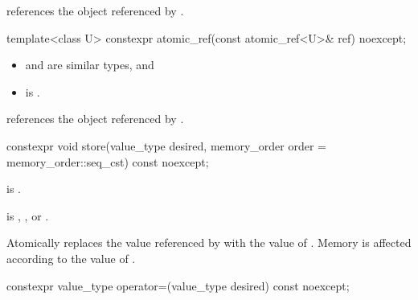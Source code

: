 \begin{itemdescr}
\pnum
\ensures
{} references the object referenced by .
\end{itemdescr}

\begin{itemdecl}
template<class U>
  constexpr atomic_ref(const atomic_ref<U>& ref) noexcept;
\end{itemdecl}

\begin{itemdescr}
\pnum
\constraints
\begin{itemize}
\item {} and  are similar types, and
\item {} is .
\end{itemize}

\pnum
\ensures
{} references the object referenced by .
\end{itemdescr}

%
%
%
%
\begin{itemdecl}
constexpr void store(value_type desired,
                     memory_order order = memory_order::seq_cst) const noexcept;
\end{itemdecl}

\begin{itemdescr}
\pnum
\constraints
{} is .

\pnum
\expects
{} is
,
, or
.

\pnum
\effects
Atomically replaces the value referenced by 
with the value of .
Memory is affected according to the value of .
\end{itemdescr}

%
%
%
%
\begin{itemdecl}
constexpr value_type operator=(value_type desired) const noexcept;
\end{itemdecl}

